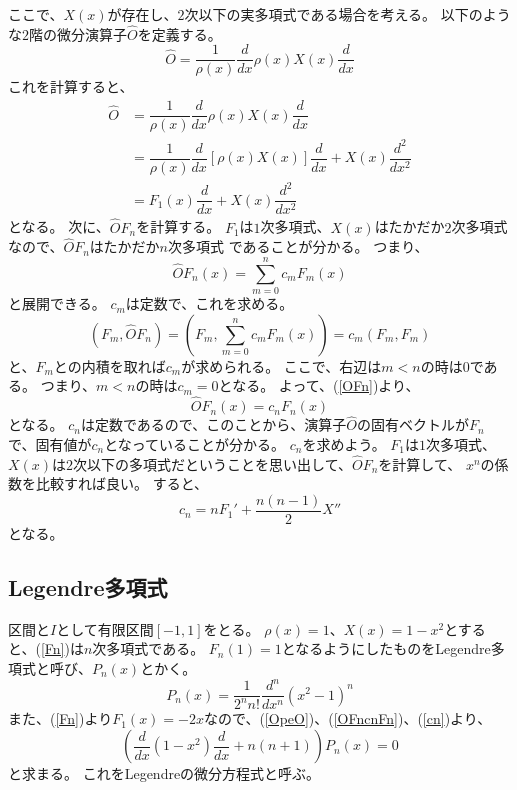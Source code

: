 ここで、$X(x)$が存在し、$2$次以下の実多項式である場合を考える。
以下のような$2$階の微分演算子$\hat{O}$を定義する。
\begin{equation}
	\label{OpeO}
	\hat{O} = \dfrac{1}{\rho(x)}\dfrac{d}{dx}\rho(x)X(x)\dfrac{d}{dx}
\end{equation}
これを計算すると、
\begin{align}
	\hat{O} &= \dfrac{1}{\rho(x)}\dfrac{d}{dx}\rho(x)X(x)\dfrac{d}{dx} \\
					&= \dfrac{1}{\rho(x)} \dfrac{d}{dx}\left[\rho(x)X(x) \right]\dfrac{d}{dx}
					+ X(x)\dfrac{d^2}{dx^2} \\
					&= F_1(x)\dfrac{d}{dx} + X(x)\dfrac{d^2}{dx^2}
\end{align}
となる。
次に、$\hat{O}F_n$を計算する。
$F_1$は$1$次多項式、$X(x)$はたかだか$2$次多項式なので、$\hat{O}F_n$はたかだか$n$次多項式
であることが分かる。
つまり、
\begin{equation}
	\label{OFn}
	\hat{O}F_n(x) = \sum_{m=0}^n c_m F_m(x)
\end{equation}
と展開できる。
$c_m$は定数で、これを求める。
\begin{equation}
	(F_m, \hat{O}F_n) = (F_m,\sum_{m=0}^n c_m F_m(x)) = c_m(F_m,F_m)
\end{equation}
と、$F_m$との内積を取れば$c_m$が求められる。
ここで、右辺は$m < n$の時は$0$である。
つまり、$m < n$の時は$c_m = 0$となる。
よって、(\ref{OFn})より、
\begin{equation}
	\label{OFncnFn}
	\hat{O}F_n(x) = c_n F_n(x)
\end{equation}
となる。
$c_n$は定数であるので、このことから、演算子$\hat{O}$の固有ベクトルが$F_n$で、固有値が$c_n$となっていることが分かる。
$c_n$を求めよう。
$F_1$は$1$次多項式、$X(x)$は$2$次以下の多項式だということを思い出して、$\hat{O}F_n$を計算して、
$x^n$の係数を比較すれば良い。
すると、
\begin{equation}
	\label{cn}
	c_n = nF_1' + \dfrac{n(n-1)}{2}X''
\end{equation}
となる。

\subsection{Legendre多項式}
区間と$I$として有限区間$[-1,1]$をとる。
$\rho(x) = 1$、$X(x) = 1 - x^2$とすると、(\ref{Fn})は$n$次多項式である。
$F_n(1) = 1$となるようにしたものをLegendre多項式と呼び、$P_n(x)$とかく。
\begin{equation}
	\label{legendre_polynomials}
	P_n(x) = \dfrac{1}{2^n n!}\dfrac{d^n}{dx^n}(x^2 - 1)^n
\end{equation}
また、(\ref{Fn})より$F_1(x) = -2x$なので、(\ref{OpeO})、(\ref{OFncnFn})、(\ref{cn})より、
\begin{equation}
	\label{legendre_DE}
	\left( \dfrac{d}{dx}(1-x^2)\dfrac{d}{dx} + n(n+1)\right)P_n(x) = 0
\end{equation}
と求まる。
これをLegendreの微分方程式と呼ぶ。

